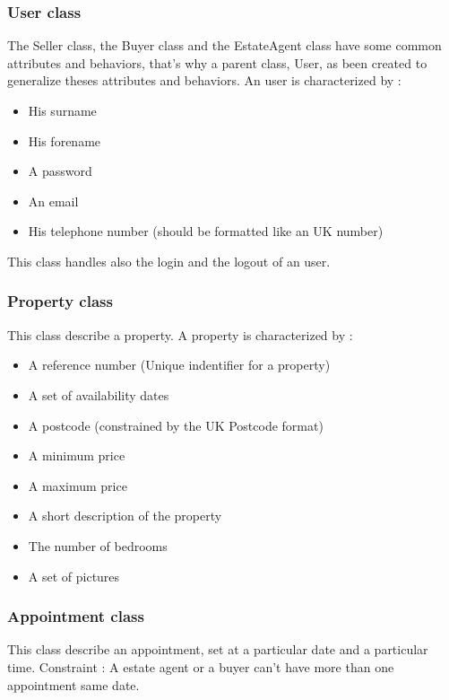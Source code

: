 \documentclass[a4paper,12pt]{article}
\begin{document}
\subsubsection{User class}
The Seller class, the Buyer class and the EstateAgent class have some common attributes and behaviors,
that's why a parent class, User, as been created to generalize theses attributes and behaviors.
An user is characterized by :
\begin{itemize}
\item His surname
\item His forename
\item A password
\item An email
\item His telephone number (should be formatted like an UK number)
\end{itemize}
This class handles also the login and the logout of an user.

\subsubsection{Property class}
This class describe a property. A property is characterized by : 
\begin{itemize}
\item A reference number (Unique indentifier for a property)
\item A set of availability dates
\item A postcode (constrained by the UK Postcode format)
\item A minimum price
\item A maximum price
\item A short description of the property
\item The number of bedrooms
\item A set of pictures
\end{itemize}

\subsubsection{Appointment class}
This class describe an appointment, set at a particular date and a particular time.
Constraint : A estate agent or a buyer can't have more than one appointment same date.
\end{document}
